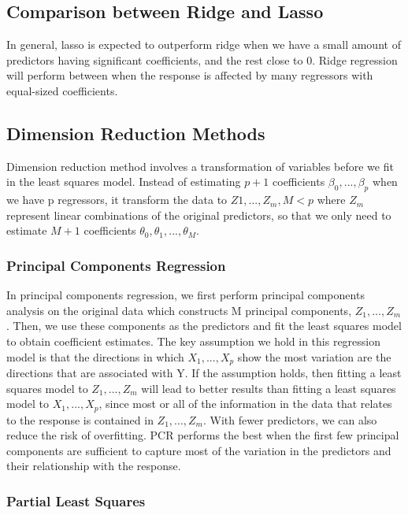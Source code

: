 \documentclass{article}
\begin{document}
\subsection{Comparison between Ridge and Lasso}

In general, lasso is expected to outperform ridge when we have a small amount of predictors having significant coefficients, and the rest close to 0. Ridge regression will perform between when the response is affected by many regressors with equal-sized coefficients. 


\subsection{Dimension Reduction Methods}

Dimension reduction method involves a transformation of variables before we fit in the least squares model. Instead of estimating $p + 1$ coefficients $\beta_0, ..., \beta_p$ when we have p regressors, it transform the data to $Z1, ..., Z_m, M < p$ where $Z_m$ represent linear combinations of the original predictors, so that we only need to estimate $M + 1$ coefficients $\theta_0, \theta_1, ..., \theta_M$. 

\subsubsection{Principal Components Regression}

In principal components regression, we first perform principal components analysis on the original data which constructs M principal components, $Z_1, ..., Z_m$. Then, we use these components as the predictors and fit the least squares model to obtain coefficient estimates. The key assumption we hold in this regression model is that the directions in which $X_1, ..., X_p$ show the most variation are the directions that are associated with Y. If the assumption holds, then fitting a least squares model to $Z_1, ..., Z_m$ will lead to better results than fitting a least squares model to $X_1, ..., X_p$, since most or all of the information in the data that relates to the response is contained in $Z_1, ..., Z_m$. With fewer predictors, we can also reduce the risk of overfitting. PCR performs the best when the first few principal components are sufficient to capture most of the variation in the predictors and their relationship with the response.

\subsubsection{Partial Least Squares}
\end{document}
